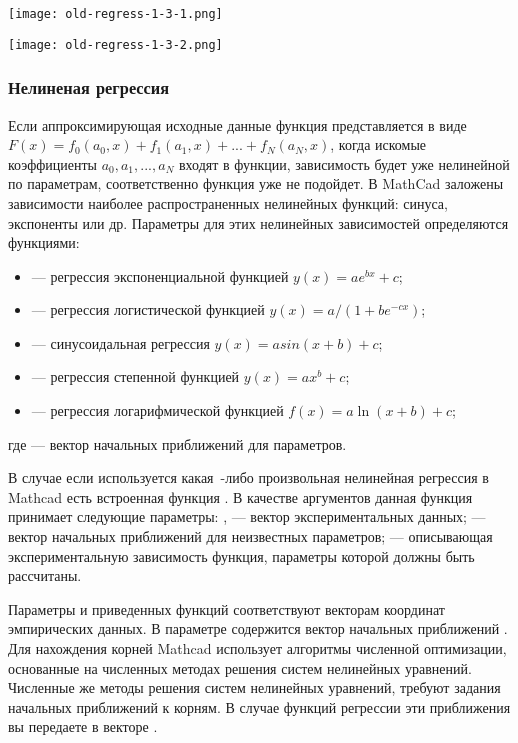 \begin{center}
	\texttt{[image: old-regress-1-3-1.png]}
\end{center}

\begin{center}
	\texttt{[image: old-regress-1-3-2.png]}
\end{center}

\subsubsection{Нелиненая регрессия}

Если аппроксимирующая исходные данные функция представляется в виде $F(x) = f_0 (a_0, x) + f_1(a_1,x) +... + f_N(a_N,x)$, когда искомые коэффициенты $a_0, a_1, ..., a_N$ входят в функции, зависимость будет уже нелинейной по параметрам, соответственно функция  уже не подойдет.
В MathCad заложены зависимости наиболее распространенных нелинейных функций: синуса, экспоненты или др. Параметры для этих нелинейных зависимостей определяются функциями: 
\begin{itemize}
	\item {} --- регрессия  экспоненциальной функцией $y(x)=a e^{b x}+c$;
	\item {} --- регрессия логистической функцией $y(x)=a/(1+b e^{-c x})$;
	\item {} --- синусоидальная регрессия $y(x)=a sin(x+b)+c$;
	\item {} --- регрессия степенной функцией $y(x)=a x^b+c$;
	\item {} --- регрессия логарифмической функцией $f(x)=a\ln(x+b)+c$;
\end{itemize}
где  --- вектор начальных приближений для параметров. 

В случае если используется какая~-либо произвольная нелинейная регрессия  в Mathcad есть встроенная функция . В качестве аргументов данная функция принимает следующие параметры: ,  --- вектор экспериментальных данных;  --- вектор начальных приближений для неизвестных параметров;
 --- описывающая экспериментальную зависимость функция, параметры которой должны быть рассчитаны.

Параметры  и  приведенных функций соответствуют векторам координат эмпирических данных. В параметре  содержится вектор начальных приближений . Для нахождения корней Mathcad использует алгоритмы численной оптимизации, основанные на численных методах решения систем нелинейных уравнений. Численные же методы решения систем нелинейных уравнений, требуют задания начальных приближений к корням. В случае функций регрессии эти приближения вы передаете в векторе .
 
